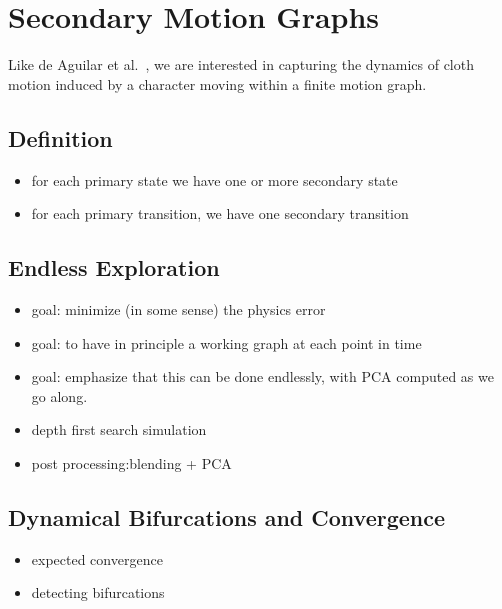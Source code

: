 \section{Secondary Motion Graphs}

Like de Aguilar et al.~, we are interested in capturing the dynamics of cloth motion induced by a character moving within a finite motion graph.


\subsection{Definition}

\begin{itemize}
\item for each primary state we have one or more secondary state
\item for each primary transition, we have one secondary transition
\end{itemize}

\subsection{Endless Exploration}

\begin{itemize}
\item goal: minimize (in some sense) the physics error
\item goal: to have in principle a working graph at each point in time
\item goal: emphasize that this can be done endlessly, with PCA computed as we go along.
\item depth first search simulation
\item post processing:blending + PCA
\end{itemize}

\subsection{Dynamical Bifurcations and Convergence}

\begin{itemize}
\item expected convergence
\item detecting bifurcations
\end{itemize}